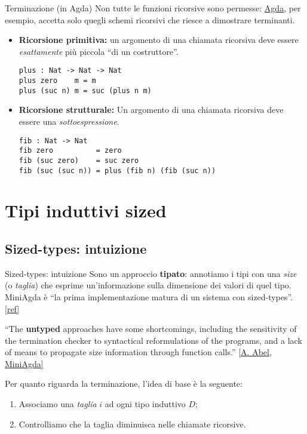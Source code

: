 \documentclass[t,aspectratio=169,9pt]{beamer}
\begin{document}
\begin{frame}[fragile]{Terminazione (in Agda)}
	Non tutte le funzioni ricorsive sono permesse: \href{https://wiki.portal.chalmers.se/agda/ReferenceManual/Totality\#Terminationchecking}{Agda}, per esempio,
	accetta solo quegli schemi ricorsivi che riesce a dimostrare
	terminanti.
	\begin{itemize}
		\item {{\bf Ricorsione primitiva:}
		      un argomento di una chiamata ricorsiva deve essere
			      {\it esattamente} più piccola ``di un costruttore''.
		      \begin{verbatim}
plus : Nat -> Nat -> Nat
plus zero    m = m
plus (suc n) m = suc (plus n m)
\end{verbatim}
		      }
		      \item{{\bf Ricorsione strutturale:}
		                  Un argomento di una chiamata ricorsiva deve essere una
			                  {\it sottoespressione}.
		                  \begin{verbatim}
fib : Nat -> Nat
fib zero          = zero
fib (suc zero)    = suc zero
fib (suc (suc n)) = plus (fib n) (fib (suc n))
		      \end{verbatim}
		            }
	\end{itemize}

\end{frame}

\section[induttivi sized]{Tipi induttivi sized}
\subsection{Sized-types: intuizione}
\begin{frame}{Sized-types: intuizione}
	Sono un approccio {\bf tipato}: annotiamo i tipi con una {\it size} (o
		{\it taglia}) che esprime un'informazione sulla dimensione dei valori di
	quel tipo. MiniAgda è ``la prima implementazione matura di un sistema con
	sized-types''. \href{https://arxiv.org/abs/1012.4896}{[ref]}

	\vskip15pt

	{
	\center
	``The {\bf untyped} approaches have some shortcomings, including
	the sensitivity of the termination checker to syntactical
	reformulations of the programs, and a lack of means to propagate
	size information through function calls.''
	\href{https://arxiv.org/abs/1012.4896}{[A. Abel, MiniAgda]}
	}

	\vskip15pt

	Per quanto riguarda la terminazione, l'idea di base è la seguente:
	\begin{enumerate}
		\item {Associamo una {\it taglia} $i$ ad ogni tipo induttivo $D$;}
		\item {Controlliamo che la taglia diminuisca nelle chiamate ricorsive.}
	\end{enumerate}
\end{frame}
\end{document}
